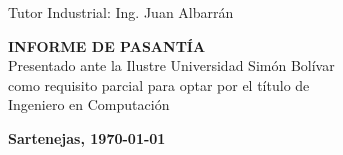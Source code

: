 \begin{titlepage}
\begin{center}
\begin{minipage}{\textwidth}
            Tutor Industrial: Ing. Juan Albarrán\\
            
            \bigskip
            \bigskip
            \vfill
            
            \textbf{INFORME DE PASANTÍA}\\
            
            Presentado ante la Ilustre Universidad Simón Bolívar\\
            
            como requisito parcial para optar por el título de\\
            
            Ingeniero en Computación
            
        \end{minipage}
        
        \bigskip
        \bigskip
        \vfill
        
         {\large \bfseries Sartenejas, \today}
    \end{center}
        
\end{titlepage}

\pagebreak
